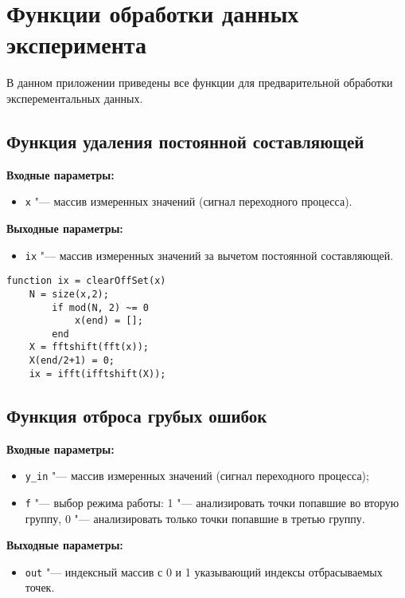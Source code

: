\chapter{Функции обработки данных эксперимента} \label{Appendix:FPE}

В данном приложении приведены все функции для предварительной обработки эксперементальных данных.

\section{Функция удаления постоянной составляющей}\label{Appendix:FPE:COF}

\noindent\textbf{Входные параметры:}
\begin{itemize}[leftmargin=1.25cm]
	\item [] \lstinline{x} "--- массив измеренных значений (сигнал переходного процесса).
\end{itemize}
\textbf{Выходные параметры:}
\begin{itemize}[leftmargin=1.25cm]
	\item [] \lstinline{ix} "--- массив измеренных значений за вычетом постоянной составляющей.
\end{itemize}

\begin{lstlisting}[label={list:clearOffSet},caption={Функция удаления постоянной составляющей}]
function ix = clearOffSet(x)
	N = size(x,2);
		if mod(N, 2) ~= 0
			x(end) = [];
		end
	X = fftshift(fft(x));
	X(end/2+1) = 0;
	ix = ifft(ifftshift(X));
\end{lstlisting}

\section{Функция отброса грубых ошибок}\label{Appendix:FPE:DGE}

\noindent\textbf{Входные параметры:}
\begin{itemize}[leftmargin=1.25cm]
	\item [] \lstinline{y_in} "--- массив измеренных значений (сигнал переходного процесса);
	\item [] \lstinline{f} "--- выбор режима работы: 1 "--- анализировать точки попавшие во вторую группу, 0 "--- анализировать только точки попавшие в третью группу.
\end{itemize}
\textbf{Выходные параметры:}
\begin{itemize}[leftmargin=1.25cm]
	\item [] \lstinline{out} "--- индексный массив с 0 и 1 указывающий индексы отбрасываемых точек.
\end{itemize}

